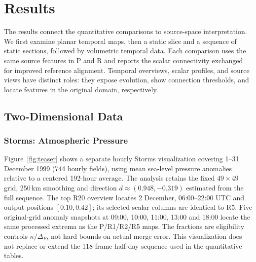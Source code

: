 \section{Results}\label{sec:results}\label{sec:applications}
The results connect the quantitative comparisons to source-space interpretation. We first examine planar temporal maps, then a static slice and a sequence of static sections, followed by volumetric temporal data. Each comparison uses the same source features in P and R and reports the scalar connectivity exchanged for improved reference alignment. Temporal overviews, scalar profiles, and source views have distinct roles: they expose evolution, show connection thresholds, and locate features in the original domain, respectively.



\subsection{Two-Dimensional Data}\label{sec:results2d}
\subsubsection{Storms: Atmospheric Pressure}
Figure~\ref{fig:teaser} shows a separate hourly Storms visualization covering 1--31 December 1999 (744 hourly fields), using mean sea-level pressure anomalies relative to a centered 192-hour average. The analysis retains the fixed $49\times49$ grid, 250\,km smoothing and direction $d\approx(0.948,-0.319)$ estimated from the full sequence. The top R20 overview locates 2 December, 06:00--22:00 UTC and output positions $[0.10,0.42]$; its selected scalar columns are identical to R5. Five original-grid anomaly snapshots at 09:00, 10:00, 11:00, 13:00 and 18:00 locate the same processed extrema as the P/R1/R2/R5 maps. The fractions are eligibility controls $\kappa/\Delta_F$, not hard bounds on actual merge error. This visualization does not replace or extend the 118-frame half-day sequence used in the quantitative tables.


